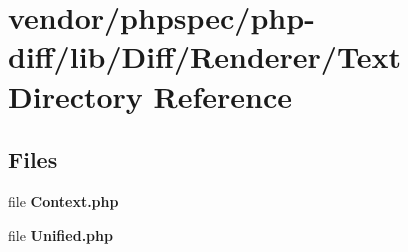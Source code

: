 \section{vendor/phpspec/php-\/diff/lib/\+Diff/\+Renderer/\+Text Directory Reference}
\label{dir_42d3dafd60a103781e695fc35a52b957}
\subsection*{Files}
\begin{DoxyCompactItemize}
\item 
file {\bf Context.\+php}
\item 
file {\bf Unified.\+php}
\end{DoxyCompactItemize}
